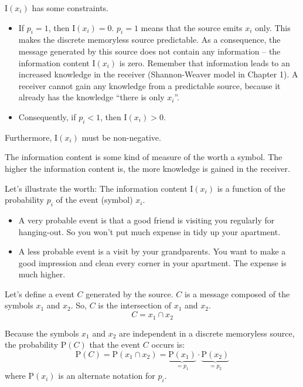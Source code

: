 \begin{refsection}
$\mathrm{I}(x_i)$ has some constraints.
\begin{itemize}
	\item If $p_i = 1$, then $\mathrm{I}(x_i) = 0$. $p_i = 1$ means that the source emits $x_i$ only. This makes the discrete memoryless source predictable. As a consequence, the message generated by this source does not contain any information -- the information content $\mathrm{I}(x_i)$ is zero. Remember that information leads to an increased knowledge in the receiver (Shannon-Weaver model in Chapter 1). A receiver cannot gain any knowledge from a predictable source, because it already has the knowledge ``there is only $x_i$''.
	\item Consequently, if $p_i < 1$, then $\mathrm{I}(x_i) > 0$.
\end{itemize}
Furthermore, $\mathrm{I}(x_i)$ must be non-negative.

\begin{example}{}
	The information content is some kind of measure of the worth a symbol. The higher the information content is, the more knowledge is gained in the receiver.
	
	Let's illustrate the worth: The information content $\mathrm{I}(x_i)$ is a function of the probability $p_i$ of the event (symbol) $x_i$.
	\begin{itemize}
		\item A very probable event is that a good friend is visiting you regularly for hanging-out. So you won't put much expense in tidy up your apartment.
		\item A less probable event is a visit by your grandparents. You want to make a good impression and clean every corner in your apartment. The expense is much higher.
	\end{itemize}
\end{example}

Let's define a event $C$ generated by the source. $C$ is a message composed of the symbols $x_1$ and $x_2$. So, $C$ is the intersection of $x_1$ and $x_2$.
\begin{equation}
	C = x_1 \cap x_2
\end{equation}

Because the symbols $x_1$ and $x_2$ are independent in a discrete memoryless source, the probability $\mathrm{P}(C)$ that the event $C$ occurs is:
\begin{equation}
	\mathrm{P}(C) = \mathrm{P}(x_1 \cap x_2) = \underbrace{\mathrm{P}(x_1)}_{= p_1} \cdot \underbrace{\mathrm{P}(x_2)}_{= p_2}
\end{equation}
where $\mathrm{P}(x_i)$ is an alternate notation for $p_i$.


\end{refsection}
